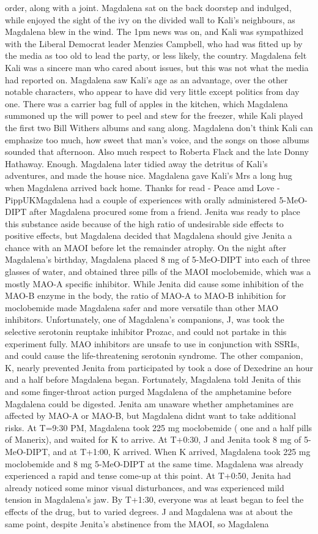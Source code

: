\documentclass[12pt]{book}
\begin{document}
order, along with a joint. Magdalena sat on the back doorstep and indulged, while enjoyed the sight of the ivy on the divided wall to Kali's neighbours, as Magdalena blew in the wind. The 1pm news was on, and Kali was sympathized with the Liberal Democrat leader Menzies Campbell, who had was fitted up by the media as too old to lead the party, or less likely, the country. Magdalena felt Kali was a sincere man who cared about issues, but this was not what the media had reported on. Magdalena saw Kali's age as an advantage, over the other notable characters, who appear to have did very little except politics from day one. There was a carrier bag full of apples in the kitchen, which Magdalena summoned up the will power to peel and stew for the freezer, while Kali played the first two Bill Withers albums and sang along. Magdalena don't think Kali can emphasize too much, how sweet that man's voice, and the songs on those albums sounded that afternoon. Also much respect to Roberta Flack and the late Donny Hathaway. Enough. Magdalena later tidied away the detritus of Kali's adventures, and made the house nice. Magdalena gave Kali's Mrs a long hug when Magdalena arrived back home. Thanks for read - Peace amd Love - PippUKMagdalena had a couple of experiences with orally administered 5-MeO-DIPT after Magdalena procured some from a friend. Jenita was ready to place this substance aside because of the high ratio of undesirable side effects to positive effects, but Magdalena decided that Magdalena should give Jenita a chance with an MAOI before let the remainder atrophy. On the night after Magdalena's birthday, Magdalena placed 8 mg of 5-MeO-DIPT into each of three glasses of water, and obtained three pills of the MAOI moclobemide, which was a mostly MAO-A specific inhibitor. While Jenita did cause some inhibition of the MAO-B enzyme in the body, the ratio of MAO-A to MAO-B inhibition for moclobemide made Magdalena safer and more versatile than other MAO inhibitors. Unfortunately, one of Magdalena's companions, J, was took the selective serotonin reuptake inhibitor Prozac, and could not partake in this experiment fully. MAO inhibitors are unsafe to use in conjunction with SSRIs, and could cause the life-threatening serotonin syndrome. The other companion, K, nearly prevented Jenita from participated by took a dose of Dexedrine an hour and a half before Magdalena began. Fortunately, Magdalena told Jenita of this and some finger-throat action purged Magdalena of the amphetamine before Magdalena could be digested. Jenita am unaware whether amphetamines are affected by MAO-A or MAO-B, but Magdalena didnt want to take additional risks. At T=9:30 PM, Magdalena took 225 mg moclobemide ( one and a half pills of Manerix), and waited for K to arrive. At T+0:30, J and Jenita took 8 mg of 5-MeO-DIPT, and at T+1:00, K arrived. When K arrived, Magdalena took 225 mg moclobemide and 8 mg 5-MeO-DIPT at the same time. Magdalena was already experienced a rapid and tense come-up at this point. At T+0:50, Jenita had already noticed some minor visual disturbances, and was experienced mild tension in Magdalena's jaw. By T+1:30, everyone was at least began to feel the effects of the drug, but to varied degrees. J and Magdalena was at about the same point, despite Jenita's abstinence from the MAOI, so Magdalena 
\end{document}
